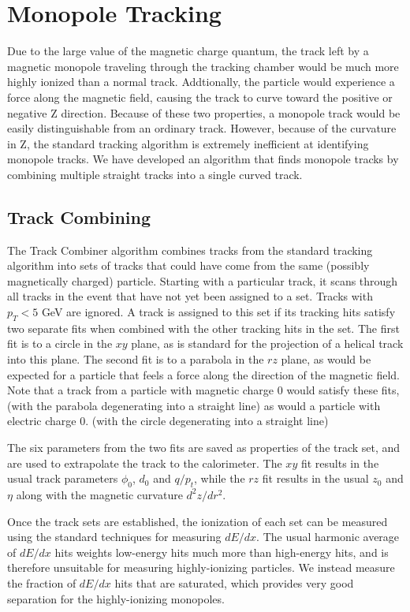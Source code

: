 \section{Monopole Tracking}

Due to the large value of the magnetic charge quantum, the track left by a magnetic monopole traveling through the tracking chamber would be much more highly ionized than a normal track.  Addtionally, the particle would experience a force along the magnetic field, causing the track to curve toward the positive or negative Z direction.  Because of these two properties, a monopole track would be easily distinguishable from an ordinary track.  However, because of the curvature in Z, the standard tracking algorithm is extremely inefficient at identifying monopole tracks.  We have developed an algorithm that finds monopole tracks by combining multiple straight tracks into a single curved track.

\subsection{Track Combining}

The Track Combiner algorithm combines tracks from the standard tracking algorithm into sets of tracks that could have come from the same (possibly magnetically charged) particle.  Starting with a particular track, it scans through all tracks in the event that have not yet been assigned to a set.  Tracks with $p_T<5$ GeV are ignored.  A track is assigned to this set if its tracking hits satisfy two separate fits when combined with the other tracking hits in the set.  The first fit is to a circle in the $xy$ plane, as is standard for the projection of a helical track into this plane.  The second fit is to a parabola in the $rz$ plane, as would be expected for a particle that feels a force along the direction of the magnetic field.  Note that a track from a particle with magnetic charge 0 would satisfy these fits, (with the parabola degenerating into a straight line) as would a particle with electric charge 0. (with the circle degenerating into a straight line)

The six parameters from the two fits are saved as properties of the track set, and are used to extrapolate the track to the calorimeter.  The $xy$ fit results in the usual track parameters $\phi_0$, $d_0$ and $q/p_t$, while the $rz$ fit results in the usual $z_0$ and $\eta$ along with the magnetic curvature $d^2 z/dr^2$.

Once the track sets are established, the ionization of each set can be measured using the standard techniques for measuring $dE/dx$.  The usual harmonic average of $dE/dx$ hits weights low-energy hits much more than high-energy hits, and is therefore unsuitable for measuring highly-ionizing particles.  We instead measure the fraction of $dE/dx$ hits that are saturated, which provides very good separation for the highly-ionizing monopoles.

